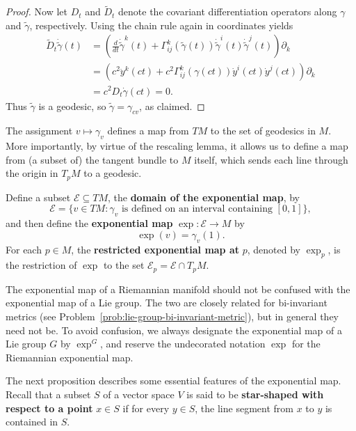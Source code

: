 \begin{lemma}
\begin{proof}
Now let $D_t$ and $\tilde{D}_t$ denote the covariant differentiation operators along $\gamma$ and $\tilde{\gamma}$, respectively. Using the chain rule again in coordinates yields
\begin{align*}
\tilde{D}_t\dot{\tilde{\gamma}}(t) &= \left(\frac{d}{dt}\dot{\tilde{\gamma}}^k(t) + \Gamma^k_{ij}(\tilde{\gamma}(t))\dot{\tilde{\gamma}}^i(t)\dot{\tilde{\gamma}}^j(t)\right)\partial_k \\
&= \left(c^2\ddot{y}^k(ct) + c^2\Gamma^k_{ij}(\gamma(ct))\dot{y}^i(ct)\dot{y}^j(ct)\right)\partial_k \\
&= c^2 D_t\dot{\gamma}(ct) = 0.
\end{align*}
Thus $\tilde{\gamma}$ is a geodesic, so $\tilde{\gamma} = \gamma_{cv}$, as claimed.
\end{proof}
\end{lemma}

The assignment $v \mapsto \gamma_v$ defines a map from $TM$ to the set of geodesics in $M$. More importantly, by virtue of the rescaling lemma, it allows us to define a map from (a subset of) the tangent bundle to $M$ itself, which sends each line through the origin in $T_p M$ to a geodesic.

Define a subset $\mathcal{E} \subseteq TM$, the \textbf{domain of the exponential map}, by
\[
\mathcal{E} = \{v \in TM : \gamma_v \text{ is defined on an interval containing } [0,1]\},
\]
and then define the \textbf{exponential map} $\exp: \mathcal{E} \to M$ by
\[
\exp(v) = \gamma_v(1).
\]
For each $p \in M$, the \textbf{restricted exponential map at } $p$, denoted by $\exp_p$, is the restriction of $\exp$ to the set $\mathcal{E}_p = \mathcal{E} \cap T_p M$.

The exponential map of a Riemannian manifold should not be confused with the exponential map of a Lie group. The two are closely related for bi-invariant metrics (see Problem~\ref{prob:lie-group-bi-invariant-metric}), but in general they need not be. To avoid confusion, we always designate the exponential map of a Lie group $G$ by $\exp^G$, and reserve the undecorated notation $\exp$ for the Riemannian exponential map.

The next proposition describes some essential features of the exponential map. Recall that a subset $S$ of a vector space $V$ is said to be \textbf{star-shaped with respect to a point} $x \in S$ if for every $y \in S$, the line segment from $x$ to $y$ is contained in $S$.

